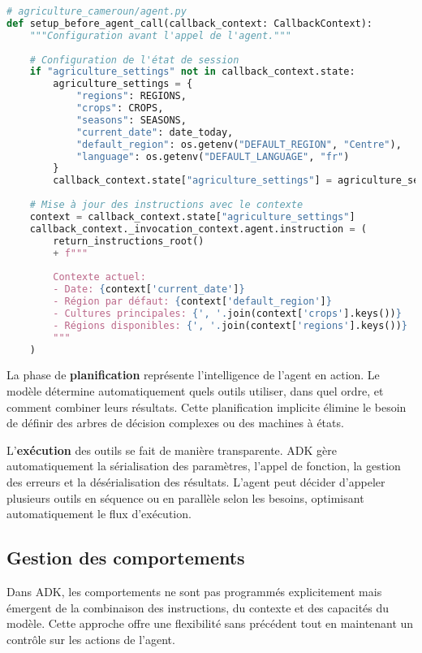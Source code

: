  
\begin{lstlisting}[language=Python, caption=Gestion du contexte avec callback]
# agriculture_cameroun/agent.py
def setup_before_agent_call(callback_context: CallbackContext):
    """Configuration avant l'appel de l'agent."""
    
    # Configuration de l'état de session
    if "agriculture_settings" not in callback_context.state:
        agriculture_settings = {
            "regions": REGIONS,
            "crops": CROPS,
            "seasons": SEASONS,
            "current_date": date_today,
            "default_region": os.getenv("DEFAULT_REGION", "Centre"),
            "language": os.getenv("DEFAULT_LANGUAGE", "fr")
        }
        callback_context.state["agriculture_settings"] = agriculture_settings
    
    # Mise à jour des instructions avec le contexte
    context = callback_context.state["agriculture_settings"]
    callback_context._invocation_context.agent.instruction = (
        return_instructions_root()
        + f"""
        
        Contexte actuel:
        - Date: {context['current_date']}
        - Région par défaut: {context['default_region']}
        - Cultures principales: {', '.join(context['crops'].keys())}
        - Régions disponibles: {', '.join(context['regions'].keys())}
        """
    )
\end{lstlisting}

La phase de \textbf{planification} représente l'intelligence de l'agent en action. Le modèle détermine automatiquement quels outils utiliser, dans quel ordre, et comment combiner leurs résultats. Cette planification implicite élimine le besoin de définir des arbres de décision complexes ou des machines à états.

L'\textbf{exécution} des outils se fait de manière transparente. ADK gère automatiquement la sérialisation des paramètres, l'appel de fonction, la gestion des erreurs et la désérialisation des résultats. L'agent peut décider d'appeler plusieurs outils en séquence ou en parallèle selon les besoins, optimisant automatiquement le flux d'exécution.

\subsection{Gestion des comportements}

Dans ADK, les comportements ne sont pas programmés explicitement mais émergent de la combinaison des instructions, du contexte et des capacités du modèle. Cette approche offre une flexibilité sans précédent tout en maintenant un contrôle sur les actions de l'agent.

